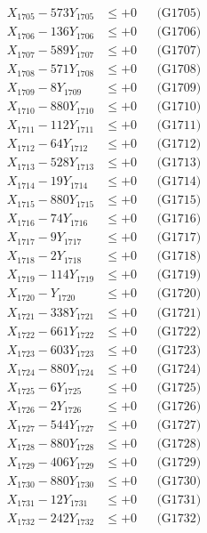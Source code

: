 \documentclass[a4paper,10pt]{article}
\begin{document}
{\begin{align}
X_{1705} - 573Y_{1705} &\leq +0 && \text{(G1705)} \\
X_{1706} - 136Y_{1706} &\leq +0 && \text{(G1706)} \\
X_{1707} - 589Y_{1707} &\leq +0 && \text{(G1707)} \\
X_{1708} - 571Y_{1708} &\leq +0 && \text{(G1708)} \\
X_{1709} - 8Y_{1709} &\leq +0 && \text{(G1709)} \\
X_{1710} - 880Y_{1710} &\leq +0 && \text{(G1710)} \\
\allowbreak
X_{1711} - 112Y_{1711} &\leq +0 && \text{(G1711)} \\
X_{1712} - 64Y_{1712} &\leq +0 && \text{(G1712)} \\
X_{1713} - 528Y_{1713} &\leq +0 && \text{(G1713)} \\
X_{1714} - 19Y_{1714} &\leq +0 && \text{(G1714)} \\
X_{1715} - 880Y_{1715} &\leq +0 && \text{(G1715)} \\
X_{1716} - 74Y_{1716} &\leq +0 && \text{(G1716)} \\
X_{1717} - 9Y_{1717} &\leq +0 && \text{(G1717)} \\
X_{1718} - 2Y_{1718} &\leq +0 && \text{(G1718)} \\
X_{1719} - 114Y_{1719} &\leq +0 && \text{(G1719)} \\
X_{1720} - Y_{1720} &\leq +0 && \text{(G1720)} \\
\allowbreak
X_{1721} - 338Y_{1721} &\leq +0 && \text{(G1721)} \\
X_{1722} - 661Y_{1722} &\leq +0 && \text{(G1722)} \\
X_{1723} - 603Y_{1723} &\leq +0 && \text{(G1723)} \\
X_{1724} - 880Y_{1724} &\leq +0 && \text{(G1724)} \\
X_{1725} - 6Y_{1725} &\leq +0 && \text{(G1725)} \\
X_{1726} - 2Y_{1726} &\leq +0 && \text{(G1726)} \\
X_{1727} - 544Y_{1727} &\leq +0 && \text{(G1727)} \\
X_{1728} - 880Y_{1728} &\leq +0 && \text{(G1728)} \\
X_{1729} - 406Y_{1729} &\leq +0 && \text{(G1729)} \\
X_{1730} - 880Y_{1730} &\leq +0 && \text{(G1730)} \\
\allowbreak
X_{1731} - 12Y_{1731} &\leq +0 && \text{(G1731)} \\
X_{1732} - 242Y_{1732} &\leq +0 && \text{(G1732)} \\

\end{align}}
\end{document}
